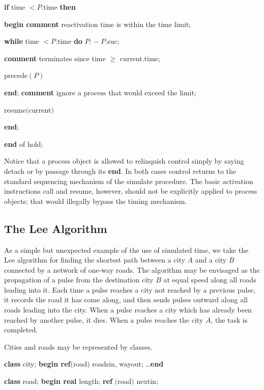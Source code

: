 \quad \quad \quad \quad \textbf{if} time $< P$.time \textbf{then}

\quad \quad \quad \quad \quad \textbf{begin comment} reactivation time is within the time limit;

\quad \quad \quad \quad \quad \quad \textbf{while} time $< P$.time \textbf{do} $P$: $-\ P$.suc;

\quad \quad \quad \quad \quad \quad \textbf{comment} terminates since time $\geqslant$ current.time;

\quad \quad \quad \quad \quad \quad precede$(P)$

\quad \quad \quad \quad \quad \textbf{end}; \textbf{comment} ignore a process that would exceed the limit;

\quad \quad \quad \quad resume$($current$)$

\quad \quad \textbf{end};

\quad \textbf{end} of hold;

\noindent
Notice that a process object is allowed to relinquish control simply by saying detach or by passage through its \textbf{end}. In both cases control returns to the standard sequencing mechanism of the simulate procedure. The basic activation instructions call and resume, however, should not be explicitly applied to process objects; that would illegally bypass the timing mechanism.

\subsection{The Lee Algorithm}

As a simple but unexpected example of the use of simulated time, we take the Lee algorithm for finding the shortest path between a city $A$ and a city $B$ connected by a network of one-way roads. The algorithm may be envisaged as the propagation of a pulse from the destination city $B$ at equal speed along all roads leading into it. Each time a pulse reaches a city not reached by a previous pulse, it records the road it has come along, and then sends pulses outward along all roads leading into the city. When a pulse reaches a city which has already been reached by another pulse, it dies. When a pulse reaches the city $A$, the task is completed.

Cities and roads may be represented by classes.

\quad \textbf{class} city; \textbf{begin ref}$($road$)$ roadsin, wayout; \dots \textbf{end}

\quad \textbf{class} road; \textbf{begin real} length; \textbf{ref} $($road$)$ nextin;

